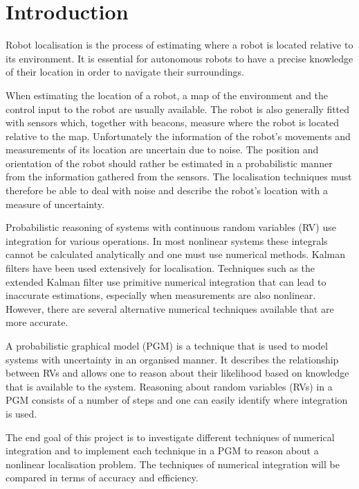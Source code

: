\documentclass[12pt,oneside,openany,a4paper, %
afrikaans,english,
]{memoir}
\numberwithin{equation}{chapter}
\begin{document}
\mainmatter
\chapter{Introduction}
Robot localisation is the process of estimating where a robot is located relative to its environment. It is essential for autonomous robots to have a precise knowledge of their location in order to navigate their surroundings.

When estimating the location of a robot, a map of the environment and the control input to the robot are usually available. The robot is also generally fitted with sensors which, together with beacons, measure where the robot is located relative to the map. Unfortunately the information of the robot's movements and measurements of its location are uncertain due to noise. The position and orientation of the robot should rather be estimated in a probabilistic manner from the information gathered from the sensors. The localisation techniques must therefore be able to deal with noise and describe the robot's location with a measure of uncertainty.

Probabilistic reasoning of systems with continuous random variables (RV) use integration for various operations. In most nonlinear systems these integrals cannot be calculated analytically and one must use numerical methods. Kalman filters have been used extensively for localisation. Techniques such as the extended Kalman filter use primitive numerical integration that can lead to inaccurate estimations, especially when measurements are also nonlinear. However, there are several alternative numerical techniques available that are more accurate.

A probabilistic graphical model (PGM) is a technique that is used to model systems with uncertainty in an organised manner. It describes the relationship between RVs and allows one to reason about their likelihood based on knowledge that is available to the system. Reasoning about random variables (RVs) in a PGM consists of a number of steps and one can easily identify where integration is used.

The end goal of this project is to investigate different techniques of numerical integration and to implement each technique in a PGM to reason about a nonlinear localisation problem. The techniques of numerical integration will be compared in terms of accuracy and efficiency.
\setcounter{secnumdepth}{2}
\end{document}
